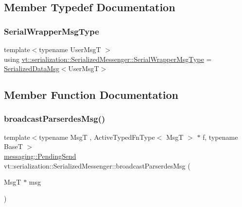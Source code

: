 \subsection{Member Typedef Documentation}
\mbox{\label{structvt_1_1serialization_1_1_serialized_messenger_a279027d1664b42cf7f288dc3fc9c3014}} 
\subsubsection{\texorpdfstring{Serial\+Wrapper\+Msg\+Type}{SerialWrapperMsgType}}
{\footnotesize\ttfamily template$<$typename User\+MsgT $>$ \\
using \hyperlink{structvt_1_1serialization_1_1_serialized_messenger_a279027d1664b42cf7f288dc3fc9c3014}{vt\+::serialization\+::\+Serialized\+Messenger\+::\+Serial\+Wrapper\+Msg\+Type} =  \hyperlink{namespacevt_1_1serialization_a56d2aee859dc963c2b5fad82649dd79a}{Serialized\+Data\+Msg}$<$User\+MsgT$>$}



\subsection{Member Function Documentation}
\mbox{\label{structvt_1_1serialization_1_1_serialized_messenger_aaba58c96e6c29a6b29137fa719c35113}} 
\subsubsection{\texorpdfstring{broadcast\+Parserdes\+Msg()}{broadcastParserdesMsg()}\hspace{0.1cm}{\footnotesize\ttfamily [1/2]}}
{\footnotesize\ttfamily template$<$typename MsgT , Active\+Typed\+Fn\+Type$<$ Msg\+T $>$ $\ast$ f, typename BaseT $>$ \\
\hyperlink{structvt_1_1messaging_1_1_pending_send}{messaging\+::\+Pending\+Send} vt\+::serialization\+::\+Serialized\+Messenger\+::broadcast\+Parserdes\+Msg (\begin{DoxyParamCaption}\item[{MsgT $\ast$}]{msg }\end{DoxyParamCaption})\hspace{0.3cm}{\ttfamily [static]}}

